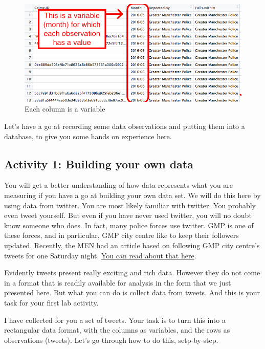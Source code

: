 \documentclass[]{book}
\theoremstyle{definition}
\theoremstyle{definition}
\theoremstyle{definition}
\theoremstyle{remark}
\begin{document}
\begin{figure}
\centering
\includegraphics{imgs/columnIsVariable.png}
\caption{Each column is a variable}
\end{figure}

Let's have a go at recording some data observations and putting them
into a database, to give you some hands on experience here.

\hypertarget{activity-1-building-your-own-data}{%
\subsection{Activity 1: Building your own
data}\label{activity-1-building-your-own-data}}

 You will get a better understanding of how data represents what you are
measuring if you have a go at building your own data set. We will do
this here by using data from twitter. You are most likely familiar with
twitter. You probably even tweet yourself. But even if you have never
used twitter, you will no doubt know someone who does. In fact, many
police forces use twitter. GMP is one of these forces, and in
particular, GMP city centre like to keep their followers updated.
Recently, the MEN had an article based on following GMP city centre's
tweets for one Saturday night.
\href{http://www.manchestereveningnews.co.uk/news/greater-manchester-news/what-police-city-centre-deal-13441129}{You
can read about that here}.

Evidently tweets present really exciting and rich data. However they do
not come in a format that is readily available for analysis in the form
that we just presented here. But what you can do is collect data from
tweets. And this is your task for your first lab activity.

I have collected for you a set of tweets. Your task is to turn this into
a rectangular data format, with the columns as variables, and the rows
as observations (tweets). Let's go through how to do this, setp-by-step.
\end{document}
